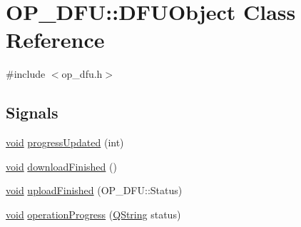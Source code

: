 \hypertarget{class_o_p___d_f_u_1_1_d_f_u_object}{\section{\-O\-P\-\_\-\-D\-F\-U\-:\-:\-D\-F\-U\-Object \-Class \-Reference}
\label{class_o_p___d_f_u_1_1_d_f_u_object}
}


{\ttfamily \#include $<$op\-\_\-dfu.\-h$>$}

\subsection*{\-Signals}
\begin{DoxyCompactItemize}
\item 
\hyperlink{group___u_a_v_objects_plugin_ga444cf2ff3f0ecbe028adce838d373f5c}{void} \hyperlink{class_o_p___d_f_u_1_1_d_f_u_object_a1747e4980c4dd7c5f7aa6a5bc8d062d6}{progress\-Updated} (int)
\item 
\hyperlink{group___u_a_v_objects_plugin_ga444cf2ff3f0ecbe028adce838d373f5c}{void} \hyperlink{class_o_p___d_f_u_1_1_d_f_u_object_aa992a6776ef6e88ef4be90c9edc6c647}{download\-Finished} ()
\item 
\hyperlink{group___u_a_v_objects_plugin_ga444cf2ff3f0ecbe028adce838d373f5c}{void} \hyperlink{class_o_p___d_f_u_1_1_d_f_u_object_a40da1291da633fd5b0135d67b55f34c1}{upload\-Finished} (\-O\-P\-\_\-\-D\-F\-U\-::\-Status)
\item 
\hyperlink{group___u_a_v_objects_plugin_ga444cf2ff3f0ecbe028adce838d373f5c}{void} \hyperlink{class_o_p___d_f_u_1_1_d_f_u_object_a8867ea1fd25b22c6189b4e60e3d1c3d5}{operation\-Progress} (\hyperlink{group___u_a_v_objects_plugin_gab9d252f49c333c94a72f97ce3105a32d}{\-Q\-String} status)
\end{DoxyCompactItemize}
